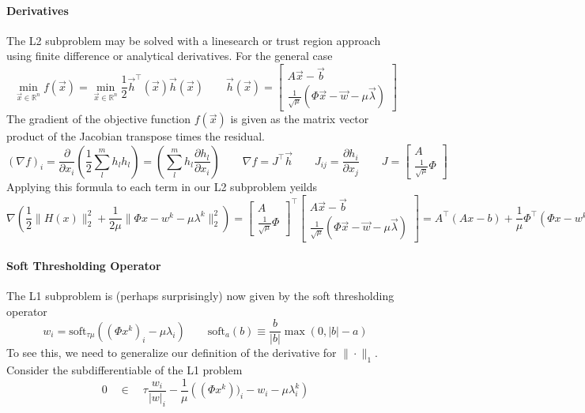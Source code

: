 \documentclass[a4paper]{article}
\begin{document}
\paragraph{Derivatives}
The L2 subproblem may be solved
with a linesearch or trust region approach using finite difference or analytical derivatives.
For the general case
\[
\min_{\vec{x} \in \mathbb{R}^n}  f(\vec{x})
=
\min_{\vec{x} \in \mathbb{R}^n}  \frac{1}{2} \vec{h}^\top(\vec{x}) \vec{h}(\vec{x})
\qquad
\vec{h}(\vec{x}) = 
\begin{bmatrix}
A \vec{x} - \vec{b}
\\
\frac{1}{\sqrt{\mu}}
\left(
\Phi \vec{x} - \vec{w} - \mu \vec{\lambda} 
\right)
\end{bmatrix}
\]
The gradient of the objective function $f(\vec{x})$ is given 
as the matrix vector product of the Jacobian transpose times the
residual.
\[
\left(
\nabla f
\right)_i
=
\frac{\partial}{\partial x_i} 
\left( 
\frac{1}{2} 
\sum_l^m h_l h_l
\right) 
 = 
\left( 
\sum_l^m h_l 
\frac{\partial h_l}{\partial x_i} 
\right) 
\qquad
\nabla f = J^\top \vec{h}
\qquad
J_{ij}    
=
\frac{\partial h_i}{\partial x_j} 
\qquad
J
=
\begin{bmatrix}
A
\\
\frac{1}{\sqrt{\mu}}
\Phi
\end{bmatrix}
\]
Applying this formula to each term in our L2 subproblem yeilds
\[
\nabla
\left(
  \frac{1}{2} \|H(x)\|_2^2 
+ \frac{1}{2 \mu }\|\Phi x   - w^k - \mu \lambda^k \|_2^2
\right)
=
\begin{bmatrix}
A
\\
\frac{1}{\sqrt{\mu}}
\Phi
\end{bmatrix}^\top
\begin{bmatrix}
A \vec{x} - \vec{b}
\\
\frac{1}{\sqrt{\mu}}
\left(
\Phi \vec{x} - \vec{w} - \mu \vec{\lambda} 
\right)
\end{bmatrix}
=
A^\top 
\left(
A x - b
\right)
+ 
\frac{1}{\mu} \Phi^\top 
\left(
\Phi x - w^k - \mu \lambda^k
\right)
\]
\paragraph{Soft Thresholding Operator}
The L1 subproblem is (perhaps surprisingly) now given
by the soft thresholding operator
\[
  w_i = \text{soft}_{\tau \mu} \left( (\Phi x^k)_i- \mu\lambda_i \right)
\qquad
  \text{soft}_a(b) \equiv \frac{b}{|b|} \max (0,|b|-a)
\]
To see this, we need to generalize our definition
of the derivative for $\|\cdot\|_1$. Consider the subdifferentiable 
of the L1 problem
\[
0 
\quad \in \quad
  \tau \frac{w_i}{|w|_i}
- \frac{1}{\mu} 
\left(
(\Phi x^k ))_i
- w_i
- \mu \lambda^k_i
\right)
\]
\end{document}
